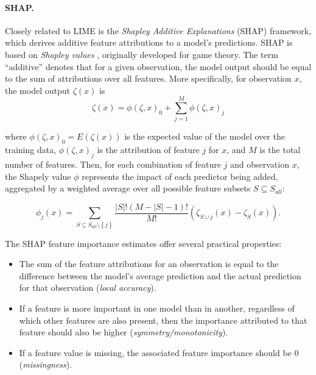 \documentclass[
  oneside]{book}
\providecommand{\tightlist}{%
  \setlength{\itemsep}{0pt}\setlength{\parskip}{0pt}}
\begin{document}
\paragraph*{SHAP.}

Closely related to LIME is the \emph{Shapley Additive Explanations} \autocite{Lundberg:SHAP2017} (SHAP) framework, which derives additive feature attributions to a model's predictions.
SHAP is based on \emph{Shapley values} \autocite{lipovetsky2001analysis,vstrumbelj2014explaining,shapley1953value}, originally developed for game theory.
The term ``additive'' denotes that for a given observation, the model output should be equal to the sum of attributions over all features.
More specifically, for observation \(x\), the model output \(\zeta(x)\) is
\begin{equation}
\zeta(x)=\phi(\zeta,x)_0 + \sum_{j=1}^M \phi(\zeta,x)_j
\label{eq:shap-additivity}
\end{equation}

where \(\phi(\zeta,x)_0=E(\zeta(x))\) is the expected value of the model over the training data, \(\phi(\zeta,x)_j\) is the attribution of feature \(j\) for \(x\), and \(M\) is the total number of features.
Then, for each combination of feature \(j\) and observation \(x\), the Shapely value \(\phi\) represents the impact of each predictor being added, aggregated by a weighted average over all possible feature subsets \(S\subseteq S_{all}\):

\begin{equation}
\phi_{j}(x)=\sum_{S\subseteq S_{all}\setminus\left\{j\right\}}\frac{|S|!(M-|S|-1)!}{M!}\left(\zeta_{S\cup{j}}(x)-\zeta_S(x)\right).
\label{eq:shapley}
\end{equation}

The SHAP feature importance estimates offer several practical properties:

\begin{itemize}
\tightlist
\item
  The sum of the feature attributions for an observation is equal to the difference between the model's average prediction and the actual prediction for that observation (\emph{local accuracy}).
\item
  If a feature is more important in one model than in another, regardless of which other features are also present, then the importance attributed to that feature should also be higher (\emph{symmetry/monotonicity}).
\item
  If a feature value is missing, the associated feature importance should be 0 (\emph{missingness}).
\end{itemize}
\end{document}
